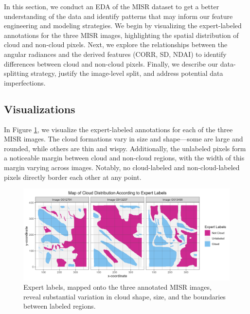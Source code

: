 \documentclass[10pt,letterpaper]{article}
\begin{document}




In this section, we conduct an EDA of the MISR dataset to get a better understanding of the data and identify patterns that may inform our feature engineering and modeling strategies. We begin by visualizing the expert-labeled annotations for the three MISR images, highlighting the spatial distribution of cloud and non-cloud pixels. Next, we explore the relationships between the angular radiances and the derived features (CORR, SD, NDAI) to identify differences between cloud and non-cloud pixels. Finally, we describe our data-splitting strategy, justify the image-level split, and address potential data imperfections.

\subsection{Visualizations}

In Figure \ref{fig:map}, we visualize the expert-labeled annotations for each of the three MISR images. The cloud formations vary in size and shape—some are large and rounded, while others are thin and wispy. Additionally, the unlabeled pixels form a noticeable margin between cloud and non-cloud regions, with the width of this margin varying across images. Notably, no cloud-labeled and non-cloud-labeled pixels directly border each other at any point.

\begin{figure}[ht]
    \centering
    \includegraphics[width=\textwidth]{figs/map.png}
    \caption{Expert labels, mapped onto the three annotated MISR images, reveal substantial variation in cloud shape, size, and the boundaries between labeled regions.}
    \label{fig:map}
\end{figure}
\end{document}
